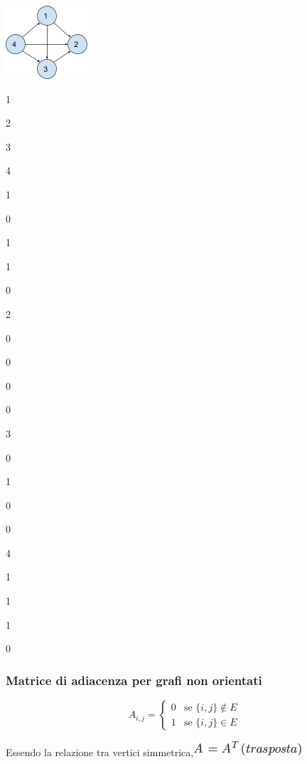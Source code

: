 \documentclass{article}
\begin{document}
{\protect\hypertarget{t.baa371c993d5b7baad0f4dd74d8432f916b9230a}{}{}\protect\hypertarget{t.37}{}{}

{\includegraphics{images/image529.png}}

{}

{1}

{2}

{3}

{4}

{1}

{0}

{1}

{1}

{0}

{2}

{0}

{0}

{0}

{0}

{3}

{0}

{1}

{0}

{0}

{4}

{1}

{1}

{1}

{0}

{}

\hypertarget{h.iuwxcos21awu}{\subsubsection{\texorpdfstring{{Matrice di
adiacenza per grafi non
orientati}}{Matrice di adiacenza per grafi non orientati}}\label{h.iuwxcos21awu}}

\begin{equation}
A_{i,j} = 
\begin{cases}
0 & \mbox{se } \{i,j\} \notin E \\ 
1 & \mbox{se } \{i,j\} \in E
\end{cases}
\end{equation}


{Essendo la relazione tra vertici simmetrica,}\includegraphics{images/image390.png}

}
\end{document}

